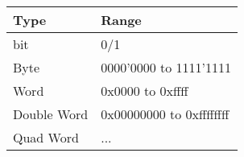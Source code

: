\documentclass[
  11pt, %
  xcolor=dvipsnames
]{beamer}
\begin{document}
\begin{frame}[fragile]
\begin{columns}[c]
\begin{column}{0.9\textwidth}
			\begin{table}
				\begin{tabular}{l l}
					\toprule
					Type        & Range                    \\
					\midrule
					bit         & 0/1                      \\
					Byte        & 0000'0000 to 1111'1111   \\
					Word        & 0x0000 to 0xffff         \\
					Double Word & 0x00000000 to 0xffffffff \\
					Quad Word   & ...                      \\
					\bottomrule
				\end{tabular}
			\end{table}

		\end{column}
	\end{columns}

\end{frame}
\end{document}
